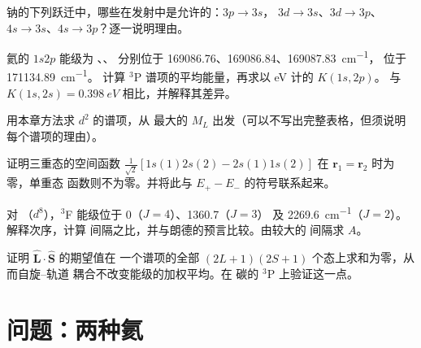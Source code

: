 \begin{exercise}[$\star\star$]\label{exo:b3:many-electron-atoms:7}
钠的下列跃迁中，哪些在发射中是允许的：$3p \to 3s$，
$3d \to 3s$、$3d \to 3p$、$4s \to 3s$、$4s \to 3p$？逐一说明理由。
\end{exercise}

\begin{exercise}[$\star\star$]\label{exo:b3:many-electron-atoms:8}
氦的 $1s2p$ 能级为 、、
 分别位于 169086.76、169086.84、\qty{169087.83}{cm^{-1}}，
 位于 \qty{171134.89}{cm^{-1}}。
计算 ${}^3$P 谱项的平均能量，再求以 eV 计的 $K(1s,2p)$。
与 $K(1s,2s) = \qty{0.398}{eV}$ 相比，并解释其差异。
\end{exercise}

\begin{exercise}[$\star\star$]\label{exo:b3:many-electron-atoms:9}
用本章方法求 $d^2$ 的谱项，从
最大的 $M_L$ 出发（可以不写出完整表格，但须说明每个谱项的理由）。
\end{exercise}

\begin{exercise}[$\star\star\star$]\label{exo:b3:many-electron-atoms:10}
证明三重态的空间函数 $\frac{1}{\sqrt2}[1s(1)2s(2) -
2s(1)1s(2)]$ 在 $\mathbf r_1 = \mathbf r_2$ 时为零，单重态
函数则不为零。并将此与 $E_+ - E_-$ 的符号联系起来。
\end{exercise}

\begin{exercise}[$\star\star\star$]\label{exo:b3:many-electron-atoms:11}
对 （$d^8$），${}^3$F 能级位于 0（$J = 4$）、1360.7（$J = 3$）
及 \qty{2269.6}{cm^{-1}}（$J = 2$）。解释次序，计算
间隔之比，并与朗德的预言比较。由较大的
间隔求 $A$。
\end{exercise}

\begin{exercise}[$\star\star\star$]\label{exo:b3:many-electron-atoms:12}
证明 $\hat{\mathbf L}\cdot\hat{\mathbf S}$ 的期望值在
一个谱项的全部 $(2L+1)(2S+1)$ 个态上求和为零，从而自旋–轨道
耦合不改变能级的加权平均。在
碳的 ${}^3$P 上验证这一点。
\end{exercise}

\section{问题：两种氦}

